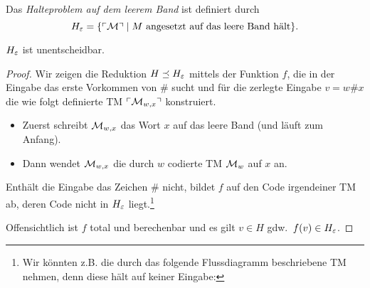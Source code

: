 \begin{Def}[name={[Halteproblem auf leerem Band $H_\Eps$]}]
	Das \emph{Halteproblem auf dem leerem Band} ist definiert durch
	\[H_\varepsilon = \{\ulcorner \mathcal{M} \urcorner \mid M \text{ angesetzt auf das leere Band hält}\}. \qedhere\]
\end{Def}
\begin{Satz}[name={[$H_\Eps$ ist unentscheidbar]}]
\label{satz:HalteproblemLeeresBand}
	$H_\Eps$ ist unentscheidbar.
\end{Satz}
\begin{proof}
  Wir zeigen die Reduktion $H \preceq H_\varepsilon$ mittels der Funktion $f$, 
  die in der Eingabe das erste Vorkommen von $\#$ sucht und
  für die zerlegte Eingabe $v = w\#x$ die wie folgt definierte \ac{TM} $\ulcorner \mathcal{M}_{w,x} \urcorner$ konstruiert.
  \begin{itemize}
  \item Zuerst schreibt $\mathcal{M}_{w,x}$ das Wort $x$ auf das leere Band (und läuft zum Anfang).
  \item Dann wendet $\mathcal{M}_{w,x}$ die durch $w$ codierte \ac{TM} $\mathcal{M}_w$ auf $x$ an.
  \end{itemize}
  Enthält die Eingabe das Zeichen $\#$ nicht, 
  bildet $f$ auf den Code irgendeiner TM ab, 
  deren Code nicht in $H_\Eps$ liegt.\footnote{
  Wir könnten z.B. die durch das folgende Flussdiagramm beschriebene TM nehmen, denn diese hält auf keiner Eingabe:
  }
  
  Offensichtlich ist $f$ total und berechenbar und es gilt $v\in H$ gdw.\ $f(v) \in H_\varepsilon$.
\end{proof}

